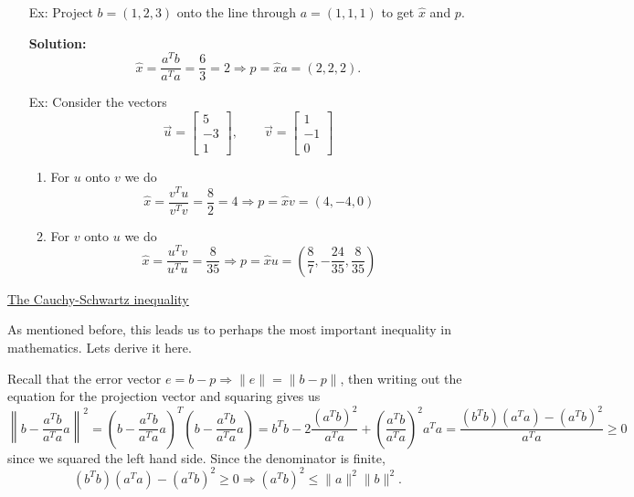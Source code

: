 \documentclass[reqno]{amsart}
\theoremstyle{definition}
\begin{document}
\begin{itemize}

\item[Ex:  ]  Project $b = (1, 2, 3)$ onto the line through $a = (1, 1, 1)$ to get $\hat{x}$ and $p$.

\textbf{Solution:  }
%
\begin{equation*}
\hat{x} = \frac{a^Tb}{a^Ta} = \frac{6}{3} = 2 \Rightarrow p = \hat{x}a = (2,2,2).
\end{equation*}

\item[Ex:    ]  Consider the vectors
%
\begin{equation*}
\vec{u} = \begin{bmatrix}
5\\
-3\\
1
\end{bmatrix},\qquad \vec{v} = \begin{bmatrix}
1\\
-1\\
0
\end{bmatrix}
\end{equation*}

\begin{enumerate}

\item  For $u$ onto $v$ we do
%
\begin{equation*}
\hat{x} = \frac{v^Tu}{v^Tv} = \frac{8}{2} = 4 \Rightarrow p = \hat{x}v = (4, -4, 0)
\end{equation*}

\item  For $v$ onto $u$ we do
%
\begin{equation*}
\hat{x} = \frac{u^Tv}{u^Tu} = \frac{8}{35} \Rightarrow p = \hat{x}u = \left(\frac{8}{7},-\frac{24}{35},\frac{8}{35}\right)
\end{equation*}

\end{enumerate}

\end{itemize}

\bigskip

\underline{The Cauchy-Schwartz inequality}

As mentioned before, this leads us to perhaps the most important inequality in mathematics.  Lets derive it here.

Recall that the error vector $e = b-p \Rightarrow \|e\| = \|b-p\|$, then writing out the equation for the projection vector and squaring gives us
%
\begin{equation*}
\left\|b - \frac{a^Tb}{a^Ta}a\right\|^2 = \left(b - \frac{a^Tb}{a^Ta}a\right)^T\left(b - \frac{a^Tb}{a^Ta}a\right) = b^Tb - 2\frac{(a^Tb)^2}{a^Ta} + \left(\frac{a^Tb}{a^Ta}\right)^2a^Ta = \frac{(b^Tb)(a^Ta) - (a^Tb)^2}{a^Ta} \geq 0
\end{equation*}
%
since we squared the left hand side.  Since the denominator is finite,
%
\begin{equation*}
(b^Tb)(a^Ta) - (a^Tb)^2 \geq 0 \Rightarrow (a^Tb)^2 \leq \|a\|^2\|b\|^2.
\end{equation*}
%
\end{document}
